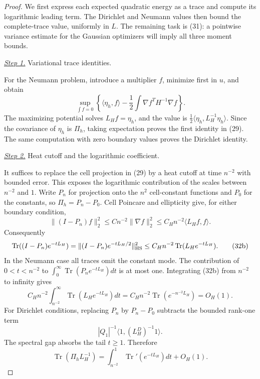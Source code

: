 \documentclass{smfart}
\theoremstyle{definition}
\newcommand{\1}{\mathbf 1}
\begin{document}
\begin{proof}
We first express each expected quadratic energy as a trace and compute
its logarithmic leading term.  The Dirichlet and Neumann values then
bound the complete-trace value, uniformly in $L$.  The remaining task
is (31): a pointwise variance estimate for the Gaussian optimizers
will imply all three moment bounds.

\smallskip\noindent
\underline{\textit{Step 1.}} Variational trace identities.

For the Neumann problem, introduce a multiplier $f$, minimize first in
$u$, and obtain
\begin{equation*}
\sup_ {\int f=0}\left\{\langle\eta_ h,f\rangle
-\frac12\int\nabla f^TH^{-1}\nabla f\right\}.
\end{equation*}
The maximizing potential solves $L_Hf=\eta_h$, and the value is
$\frac12\langle\eta_h,L_H^{-1}\eta_h\rangle$.  Since the covariance
of $\eta_h$ is $\Pi_h$, taking expectation proves the first identity
in (29).  The same computation with zero boundary values proves the
Dirichlet identity.

\smallskip\noindent
\underline{\textit{Step 2.}} Heat cutoff and the logarithmic coefficient.

It suffices to replace the cell projection in (29) by a heat cutoff at
time $n^{-2}$ with bounded error.  This exposes the logarithmic
contribution of the scales between $n^{-2}$ and $1$.
Write $P_n$ for projection onto the $n^2$ cell-constant functions and
$P_0$ for the constants, so $\Pi_h=P_n-P_0$.  Cell Poincare and
ellipticity give, for either boundary condition,
\begin{equation}
\|(I-P_ n)f\|_ 2^2\leq Cn^{-2}\|\nabla f\|_ 2^2
\leq C_ Hn^{-2}\langle L_ Hf,f\rangle.
\tag{32a}
\end{equation}
Consequently
\begin{equation}
\operatorname {Tr}((I-P_ n)e^{-tL_ H})
=\|(I-P_ n)e^{-tL_ H/2}\|_ {\rm HS}^2
\leq C_ Hn^{-2}\operatorname {Tr}(L_ He^{-tL_ H}).
\tag{32b}
\end{equation}
In the Neumann case all traces omit the constant mode.  The contribution
of $0<t<n^{-2}$ to
$\int_ 0^\infty\operatorname {Tr}(P_ ne^{-tL_ H})dt$ is at most one.
Integrating (32b) from $n^{-2}$ to infinity gives
\begin{equation}
C_ Hn^{-2}\int_ {n^{-2}}^\infty
\operatorname {Tr}(L_ He^{-tL_ H})dt
=C_ Hn^{-2}\operatorname {Tr}(e^{-n^{-2}L_ H})=O_ H(1).
\tag{32c}
\end{equation}
For Dirichlet conditions, replacing $P_n$ by $P_n-P_0$ subtracts the
bounded rank-one term
\[
|Q_1|^{-1}\langle1,(L_H^D)^{-1}1\rangle.
\]
The spectral gap absorbs the tail $t\geq1$.  Therefore
\begin{equation}
\operatorname {Tr}(\Pi_ hL_ H^{-1})
=\int_ {n^{-2}}^1\operatorname {Tr}'(e^{-tL_ H})dt+O_ H(1).
\tag{32d}
\end{equation}


\end{proof}
\end{document}
